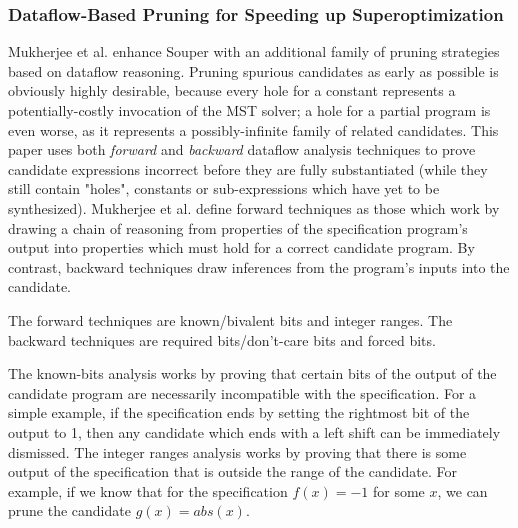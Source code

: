 \documentclass[12pt,twoside]{reedthesis}
\begin{document}
        \subsubsection{Dataflow-Based Pruning for Speeding up Superoptimization}
            Mukherjee et al. \cite{mukherjee2020dataflow} enhance Souper with an additional family of pruning strategies based on dataflow reasoning. 
            Pruning spurious candidates as early as possible is obviously highly desirable, because every hole for a constant represents a potentially-costly invocation of the MST solver; a hole for a partial program is even worse, as it represents a possibly-infinite family of related candidates.
            This paper uses both \textit{forward} and \textit{backward} dataflow analysis techniques to prove candidate expressions incorrect before they are fully substantiated (while they still contain "holes", constants or sub-expressions which have yet to be synthesized).
            Mukherjee et al. define forward techniques as those which work by drawing a chain of reasoning from properties of the specification program's output into properties which must hold for a correct candidate program.
            By contrast, backward techniques draw inferences from the program's inputs into the candidate.
                
            The forward techniques are known/bivalent bits and integer ranges.
            The backward techniques are required bits/don't-care bits and forced bits.
                
            The known-bits analysis works by proving that certain bits of the output of the candidate program are necessarily incompatible with the specification.
                For a simple example, if the specification ends by setting the rightmost bit of the output to 1, then any candidate which ends with a left shift can be immediately dismissed.
            The integer ranges analysis works by proving that there is some output of the specification that is outside the range of the candidate.
                For example, if we know that for the specification $f(x) = -1$ for some $x$, we can prune the candidate $g(x) = abs(x)$.
                
\end{document}

